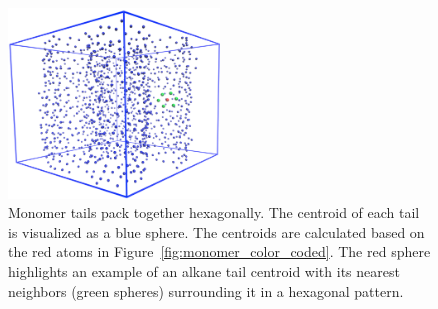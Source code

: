\documentclass{article}
\begin{document}
  \begin{figure}[!ht]
        \centering
                \includegraphics[width=0.5\textwidth]{centroids_box.png}
		\caption{Monomer tails pack together hexagonally. The centroid
			of each tail is visualized as a blue sphere. The centroids are calculated based
			on the red atoms in Figure~\ref{fig:monomer_color_coded}. The red sphere
			highlights an example of an alkane tail centroid with its nearest neighbors
			(green spheres) surrounding it in a hexagonal pattern.}\label{fig:centroids}
  \end{figure}
\end{document}
